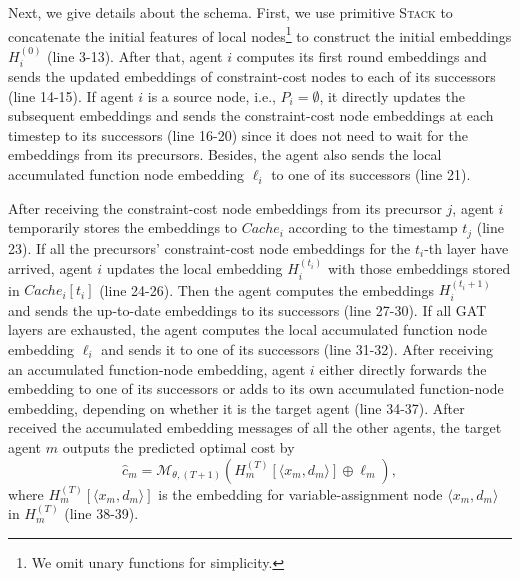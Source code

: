 \documentclass[letterpaper]{article} %
\begin{document}

Next, we give details about the schema. First, we use primitive \textsc{Stack} to concatenate the initial features of local nodes\footnote{We omit unary functions for simplicity.} to construct the initial embeddings $H^{(0)}_i$ (line 3-13). After that, agent $i$ computes its first round embeddings and sends the updated embeddings of constraint-cost nodes to each of its successors (line 14-15). If agent $i$ is a source node, i.e., $P_i=\emptyset$, it directly updates the subsequent embeddings and sends the constraint-cost node embeddings at each timestep to its successors (line 16-20) since it does not need to wait for the embeddings from its precursors. Besides, the agent also sends the local accumulated function node embedding $\ell_i$ to one of its successors (line 21).

After receiving the constraint-cost node embeddings from its precursor $j$, agent $i$ temporarily stores the embeddings to $Cache_i$ according to the timestamp $t_j$ (line 23). If all the precursors' constraint-cost node embeddings for the $t_i$-th layer have arrived, agent $i$ updates the local embedding $H_i^{(t_i)}$ with those embeddings stored in $Cache_i[t_i]$ (line 24-26). Then the agent computes the embeddings $H_i^{(t_i+1)}$ and sends the up-to-date embeddings to its successors (line 27-30). If all GAT layers are exhausted, the agent computes the local accumulated function node embedding $\ell_i$ and sends it to one of its successors (line 31-32). After receiving an accumulated function-node embedding, agent $i$ either directly forwards the embedding to one of its successors or adds to its own accumulated function-node embedding, depending on whether it is the target agent (line 34-37). After received the accumulated embedding messages of all the other agents, the target agent $m$ outputs the predicted optimal cost by
\begin{equation}
    \hat{c}_m=\mathcal{M}_{\theta, (T+1)}(H_m^{(T)}[\langle x_m,d_m\rangle]\oplus \ell_m), \label{eq-dis-mlp}
\end{equation}
where $H_m^{(T)}[\langle x_m,d_m\rangle]$ is the embedding for variable-assignment node $\langle x_m,d_m\rangle$ in $H_m^{(T)}$ (line 38-39).
\end{document}
